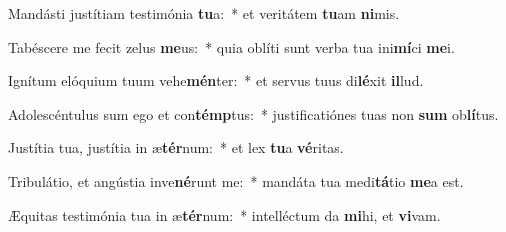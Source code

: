 \item Mandásti justítiam testimónia \textbf{tu}a:~* et veritátem \textbf{tu}am \textbf{ni}mis.
\item Tabéscere me fecit zelus \textbf{me}us:~* quia oblíti sunt verba tua ini\textbf{mí}ci \textbf{me}i.
\item Ignítum elóquium tuum vehe\textbf{mén}ter:~* et servus tuus di\textbf{lé}xit \textbf{il}lud.
\item Adolescéntulus sum ego et con\textbf{témp}tus:~* justificatiónes tuas non \textbf{sum} ob\textbf{lí}tus.
\item Justítia tua, justítia in æ\textbf{tér}num:~* et lex \textbf{tu}a \textbf{vé}ritas.
\item Tribulátio, et angústia inve\textbf{né}runt me:~* mandáta tua medi\textbf{tá}tio \textbf{me}a est.
\item Æquitas testimónia tua in æ\textbf{tér}num:~* intelléctum da \textbf{mi}hi, et \textbf{vi}vam.
